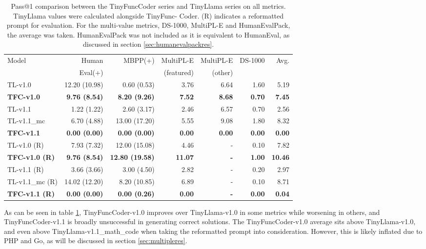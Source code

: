 \begin{table}[h]
    \centering
    \small
    \caption{Pass@1 comparison between the TinyFuncCoder series and TinyLlama series on all metrics. TinyLlama values were calculated alongside TinyFunc-
    Coder. (R) indicates a reformatted prompt for evaluation. For the multi-value metrics, DS-1000, MultiPL-E and HumanEvalPack, the average was taken. HumanEvalPack was not included as it is equivalent to HumanEval, as discussed in section \ref{sec:humanevalpackres}.}
    \begin{tabular}{l|rrrrrr}
        \hline
        Model & Human & MBPP(+) & MultiPL-E & MultiPL-E & DS-1000 & Avg. \\
         & Eval(+) & & (featured) & (other) & \\
        \hline
        TL-v1.0 & 12.20 (10.98) & 0.60 (0.53) & 3.76 & 6.64 & 1.60 & 5.19 \\
        \textbf{TFC-v1.0} & \textbf{9.76 (8.54)} & \textbf{8.20 (9.26)} & \textbf{7.52} & \textbf{8.68} & \textbf{0.70} & \textbf{7.45} \\
        TL-v1.1 & 1.22 (1.22) & 2.60 (3.17) & 2.46 & 6.57 & 0.70 & 2.56 \\
        TL-v1.1\_mc & 6.70 (4.88) & 13.00 (17.20) & 5.55 & 9.08 & 1.80 & 8.32 \\
        \textbf{TFC-v1.1} & \textbf{0.00 (0.00)} & \textbf{0.00 (0.00)} & \textbf{0.00} & \textbf{0.00} & \textbf{0.00} & \textbf{0.00} \\
        \hline
        TL-v1.0 (R) & 7.93 (7.32) & 12.00 (15.08) & 4.46 & - & 0.10 & 7.82 \\
        \textbf{TFC-v1.0 (R)} & \textbf{9.76 (8.54)} & \textbf{12.80 (19.58)} & \textbf{11.07} & \textbf{-} & \textbf{1.00} & \textbf{10.46} \\
        TL-v1.1 (R) & 3.66 (3.66) & 3.00 (4.50) & 2.82 & - & 0.20 & 2.97 \\
        TL-v1.1\_mc (R) & 14.02 (12.20) & 8.20 (10.85) & 6.89 & - & 0.10 & 8.71 \\
        \textbf{TFC-v1.1 (R)} & \textbf{0.00 (0.00)} & \textbf{0.00 (0.26)} & \textbf{0.00} & \textbf{-} & \textbf{0.00} & \textbf{0.04} \\
        \hline
    \end{tabular}
    \label{tab:resoverview}
\end{table}

As can be seen in table \ref{tab:resoverview}, TinyFuncCoder-v1.0 improves over TinyLlama-v1.0 in some metrics while worsening in others, and TinyFuncCoder-v1.1 is broadly unsuccessful in generating correct solutions.
The TinyFuncCoder-v1.0 average sits above TinyLlama-v1.0, and even above TinyLlama-v1.1\_math\_code when taking the reformatted prompt into consideration.
However, this is likely inflated due to PHP and Go, as will be discussed in section \ref{sec:multipleres}.


